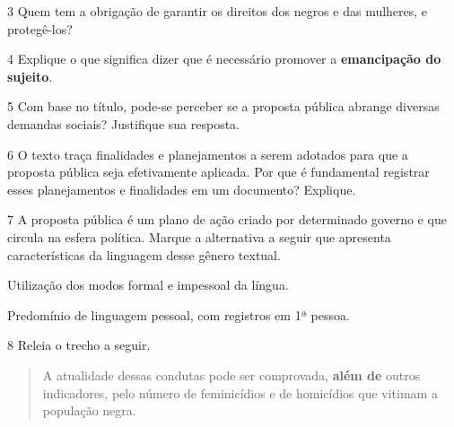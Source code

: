 
\num{3} Quem tem a obrigação de garantir os direitos dos negros e das
mulheres, e protegê-los?


\num{4} Explique o que significa dizer que é necessário promover a \textbf{emancipação do sujeito}.



\num{5} Com base no título, pode-se perceber se a proposta pública abrange
diversas demandas sociais? Justifique sua resposta.


\num{6} O texto traça finalidades e planejamentos a serem adotados para que a
proposta pública seja efetivamente aplicada. Por que é fundamental
registrar esses planejamentos e finalidades em um documento? Explique.



\num{7} A proposta pública é um plano de ação criado por determinado governo
e que circula na esfera política. Marque a alternativa a seguir que
apresenta características da linguagem desse gênero textual.

\begin{boxlist}
 Utilização dos modos formal e impessoal da língua.

 Predomínio de linguagem pessoal, com registros em 1ª pessoa.
\end{boxlist}

\num{8} Releia o trecho a seguir.

\begin{quote}
A atualidade dessas condutas pode ser comprovada, \textbf{além de}
outros indicadores, pelo número de feminicídios e de homicídios que
vitimam a população negra.
\end{quote}

